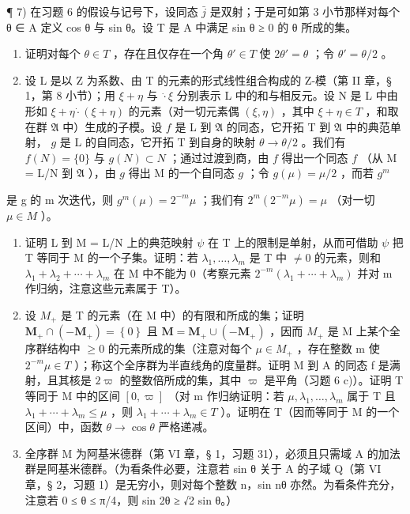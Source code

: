 ¶ 7) 在习题 6 的假设与记号下，设同态 \(\bar{j}\) 是双射；于是可如第 3 小节那样对每个 θ ∈ A 定义 cos θ 与 sin θ。设 T 是 A 中满足 sin θ ≥ 0 的 θ 所成的集。

\begin{enumerate}
\def\labelenumi{\alph{enumi})}
\item
  证明对每个 \(\theta \in T\) ，存在且仅存在一个角 \(\theta' \in T\) 使 \(2\theta' = \theta\) ；令 \(\theta' = \theta/2\) 。
\item
  设 L 是以 Z 为系数、由 T 的元素的形式线性组合构成的 Z-模（第 II 章，§ 1，第 8 小节）；用 \(\xi + \eta\) 与 \(\dot{\cdot} \xi\) 分别表示 L 中的和与相反元。设 N 是 L 中由形如 \(\xi + \eta \dot{\cdot} (\xi + \eta)\) 的元素（对一切元素偶 \((\xi, \eta)\) ，其中 \(\xi + \eta \in T\) ，和取在群 \(\mathfrak{A}\) 中）生成的子模。设 \(f\) 是 L 到 \(\mathfrak{A}\) 的同态，它开拓 T 到 \(\mathfrak{A}\) 中的典范单射， \(g\) 是 L 的自同态，它开拓 T 到自身的映射 \(\theta \to \theta/2\) 。我们有 \(f(N) = \{0\}\) 与 \(g(N) \subset N\) ；通过过渡到商，由 \(f\) 得出一个同态 \(f\) （从 M = L/N 到 \(\mathfrak{A}\) ），由 \(g\) 得出 M 的一个自同态 \(g\) ；令 \(g(\mu) = \mu/2\) ，而若 \(g^m\)
\end{enumerate}

是 g 的 m 次迭代，则 \(g^{m}(\mu) = 2^{-m}\mu\) ；我们有 \(2^{m}(2^{-m}\mu) = \mu\) （对一切 \(\mu \in M\) ）。

\begin{enumerate}
\def\labelenumi{\alph{enumi})}
\setcounter{enumi}{2}
\item
  证明 L 到 M = L/N 上的典范映射 \(\psi\) 在 T 上的限制是单射，从而可借助 \(\psi\) 把 T 等同于 M 的一个子集。证明：若 \(\lambda_1, \ldots, \lambda_m\) 是 T 中 \(\neq 0\) 的元素，则和 \(\lambda_1 + \lambda_2 + \cdots + \lambda_m\) 在 M 中不能为 0（考察元素 \(2^{-m}(\lambda_1 + \cdots + \lambda_m)\) 并对 m 作归纳，注意这些元素属于 T）。
\item
  设 \(M_{+}\) 是 T 的元素（在 M 中）的有限和所成的集；证明 \(\mathbf{M}_{+}\cap(-\mathbf{M}_{+})=\left\{0\right\}\) 且 \(\mathbf{M}=\mathbf{M}_{+}\cup(-\mathbf{M}_{+})\) ，因而 \(M_{+}\) 是 M 上某个全序群结构中 \(\geqslant0\) 的元素所成的集（注意对每个 \(\mu\in M_{+}\) ，存在整数 m 使 \(2^{-m}\mu\in T\) ）；称这个全序群为半直线角的度量群。证明 M 到 A 的同态 f 是满射，且其核是 \(2\varpi\) 的整数倍所成的集，其中 \(\varpi\) 是平角（习题 6 c)）。证明 T 等同于 M 中的区间 \([0,\varpi]\) （对 m 作归纳证明：若 \(\mu,\lambda_{1},\ldots,\lambda_{m}\) 属于 T 且 \(\lambda_{1}+\cdots+\lambda_{m}\leqslant\mu\) ，则 \(\lambda_{1}+\cdots+\lambda_{m}\in T\) ）。证明在 T（因而等同于 M 的一个区间）中，函数 \(\theta\to\cos\theta\) 严格递减。
\item
  全序群 M 为阿基米德群（第 VI 章，§ 1，习题 31），必须且只需域 A 的加法群是阿基米德群。（为看条件必要，注意若 sin θ 关于 A 的子域 Q（第 VI 章，§ 2，习题 1）是无穷小，则对每个整数 n，sin nθ 亦然。为看条件充分，注意若 0 ≤ θ ≤ π/4，则 sin 2θ ≥ √2 sin θ。）
\end{enumerate}

